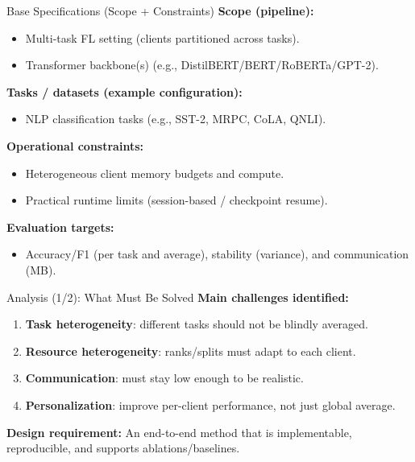 \documentclass[aspectratio=169]{beamer}
\newcommand{\hl}[1]{\textcolor{cnamred}{\textbf{#1}}}
\begin{document}
\begin{frame}{Base Specifications (Scope + Constraints)}
\textbf{Scope (pipeline):}
\begin{itemize}
  \item Multi-task FL setting (clients partitioned across tasks).
  \item Transformer backbone(s) (e.g., DistilBERT/BERT/RoBERTa/GPT-2).
\end{itemize}

\vspace{0.2cm}
\textbf{Tasks / datasets (example configuration):}
\begin{itemize}
  \item NLP classification tasks (e.g., SST-2, MRPC, CoLA, QNLI).
\end{itemize}

\vspace{0.2cm}
\textbf{Operational constraints:}
\begin{itemize}
  \item Heterogeneous client memory budgets and compute.
  \item Practical runtime limits (session-based / checkpoint resume).
\end{itemize}

\vspace{0.2cm}
\textbf{Evaluation targets:}
\begin{itemize}
  \item Accuracy/F1 (per task and average), stability (variance), and communication (MB).
\end{itemize}
\end{frame}

\begin{frame}{Analysis (1/2): What Must Be Solved}
\textbf{Main challenges identified:}
\begin{enumerate}
  \item \hl{Task heterogeneity}: different tasks should not be blindly averaged.
  \item \hl{Resource heterogeneity}: ranks/splits must adapt to each client.
  \item \hl{Communication}: must stay low enough to be realistic.
  \item \hl{Personalization}: improve per-client performance, not just global average.
\end{enumerate}

\vspace{0.3cm}
\textbf{Design requirement:} An end-to-end method that is implementable, reproducible, and supports ablations/baselines.
\end{frame}
\end{document}
